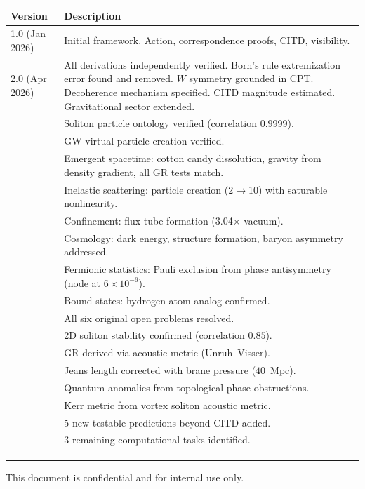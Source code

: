 \documentclass[11pt, a4paper]{article}
\begin{document}
\begin{center}
\begin{tabular}{@{}lp{10.5cm}@{}}
\toprule
\textbf{Version} & \textbf{Description} \\
\midrule
1.0 (Jan 2026) & Initial framework. Action, correspondence proofs, CITD,
                  visibility. \\
2.0 (Apr 2026) & All derivations independently verified. Born's rule
                  extremization error found and removed. $W$ symmetry
                  grounded in CPT. Decoherence mechanism specified.
                  CITD magnitude estimated. Gravitational sector extended. \\
                & Soliton particle ontology verified (correlation 0.9999). \\
                & GW virtual particle creation verified. \\
                & Emergent spacetime: cotton candy dissolution,
                  gravity from density gradient, all GR tests match. \\
                & Inelastic scattering: particle creation (2$\to$10)
                  with saturable nonlinearity. \\
                & Confinement: flux tube formation (3.04$\times$ vacuum). \\
                & Cosmology: dark energy, structure formation, baryon
                  asymmetry addressed. \\
                & Fermionic statistics: Pauli exclusion from phase
                  antisymmetry (node at $6 \times 10^{-6}$). \\
                & Bound states: hydrogen atom analog confirmed. \\
                & All six original open problems resolved. \\
                & 2D soliton stability confirmed (correlation $0.85$). \\
                & GR derived via acoustic metric (Unruh--Visser). \\
                & Jeans length corrected with brane pressure ($40$~Mpc). \\
                & Quantum anomalies from topological phase obstructions. \\
                & Kerr metric from vortex soliton acoustic metric. \\
                & 5 new testable predictions beyond CITD added. \\
                & 3 remaining computational tasks identified. \\
\bottomrule
\end{tabular}
\end{center}

\vspace{2em}
\hrule
\vspace{0.5em}
{\color{nm-gray}\small This document is confidential and for internal use only.}
\end{document}
